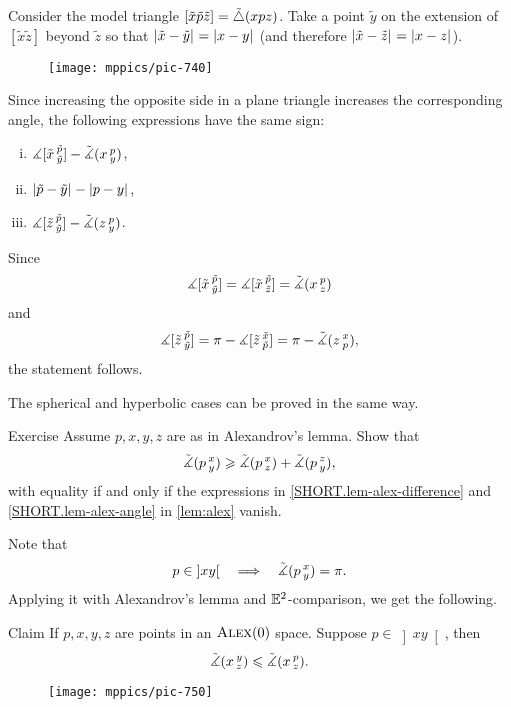 Consider the model triangle $[\tilde x\tilde p\tilde z]=\tilde\triangle(x p z)$.
Take 
a point $\tilde y$ on the extension of 
$[\tilde x \tilde z]$ beyond $\tilde z$ so that $|{\tilde x}-{\tilde y}|_{}^{{}}=|{x}-{y}|_{}^{{}}$ (and therefore $|{\tilde x}-{\tilde z}|_{}^{{}}=|{x}-{z}|_{}^{{}}$). 

\begin{wrapfigure}{r}{33mm}
\vskip-0mm
\centering
\texttt{[image: mppics/pic-740]}
\end{wrapfigure}

Since increasing the opposite side in a plane triangle increases the corresponding angle, 
the following expressions have the same sign:
\begin{enumerate}[(i)]
\item $\measuredangle[\tilde x\,{}^{\tilde p}_{\tilde y}]-\tilde\measuredangle(x\,{}^{p}_{y})$,
\item $|{\tilde p}-{\tilde y}|_{}^{{}}-|{p}-{y}|_{}^{{}}$,
\item $\measuredangle[\tilde z\,{}^{\tilde p}_{\tilde y}]-\tilde\measuredangle(z\,{}^{p}_{y})$.
\end{enumerate}
Since 
\[\measuredangle[\tilde x\,{}^{\tilde p}_{\tilde y}]=\measuredangle[\tilde x\,{}^{\tilde p}_{\tilde z}]=\tilde\measuredangle(x\,{}^{p}_{z})\]
and
\[ \measuredangle[\tilde z\,{}^{\tilde p}_{\tilde y}]
=\pi-\measuredangle[\tilde z\,{}^{\tilde x}_{\tilde p}]
=\pi-\tilde\measuredangle(z\,{}^{x}_{p}),\]
the statement follows.


The spherical and hyperbolic cases can be proved in the same way.
\qeds

\begin{thm}{Exercise}\label{ex:alex-lemma-cat}
Assume $p,x,y,z$ are as in Alexandrov's lemma.
Show that
\[\tilde\measuredangle(p\,{}^{x}_{y})
\geqslant
\tilde\measuredangle(p\,{}^{x}_{z}) + \tilde\measuredangle(p\,{}^{z}_{y}),\]
with equality if and only if the expressions in \ref{SHORT.lem-alex-difference} and \ref{SHORT.lem-alex-angle} in \ref{lem:alex} vanish.
\end{thm}

Note that 
\[p\in\left]x y\right[
\quad\Longrightarrow\quad
\tilde\measuredangle(p\,{}^{x}_{y})=\pi.
\]
Applying it with Alexandrov's lemma and $\mathbb{E}^2$-comparison, we get the following.

\begin{thm}{Claim}\label{clm:angle-mono}
If $p,x,y,z$ are points in an $\textsc{Alex}(0)$ space.
Suppose $p\in\left]x y\right[$, then 
\[\tilde\measuredangle(x\,{}^{y}_{z})\leqslant \tilde\measuredangle(x\,{}^{p}_{z}).\]
\end{thm}

\begin{wrapfigure}{r}{25mm}
\vskip-0mm
\centering
\texttt{[image: mppics/pic-750]}
\end{wrapfigure}

